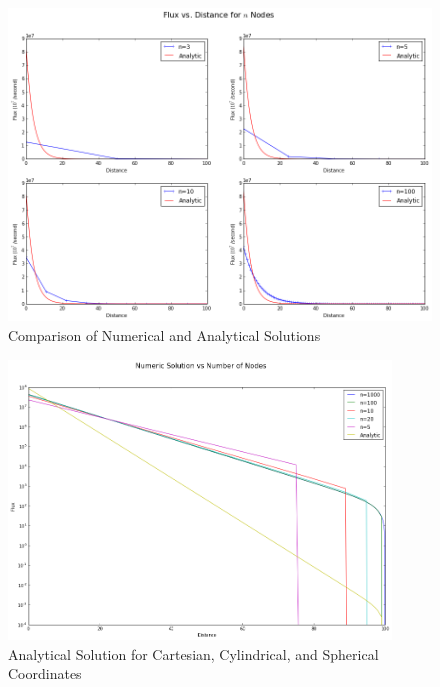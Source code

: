 \documentclass[10pt,peerreviewca]{IEEEtran} %
\begin{document}
	\begin{figure}
		\includegraphics[width=7in]{analytic_vs_numerical}
		\caption{Comparison of Numerical and Analytical Solutions}
		\label{fig:numerical_vs_analytical}
	\end{figure}

	\begin{figure}
		\begin{centering}
		\includegraphics[width=4in]{flux_vs_nodes_one_graph}
		\caption{Analytical Solution for Cartesian, Cylindrical, and Spherical Coordinates}
		\label{fig:many nodes one chart}
		\end{centering}
	\end{figure}
\end{document}
